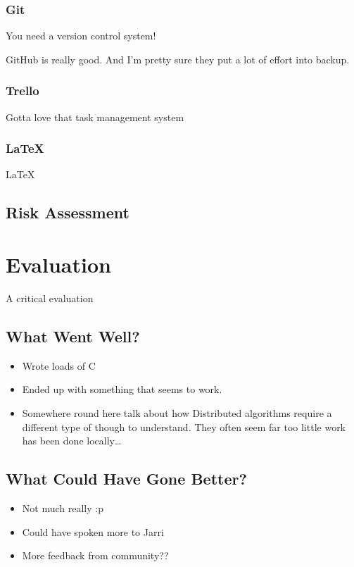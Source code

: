 \documentclass[12pt]{report}
\begin{document}
\subsection{Git}
You need a version control system!

GitHub is really good. And I'm pretty sure they put a lot of effort into backup.

\subsection{Trello}
Gotta love that task management system

\subsection{\LaTeX}
\LaTeX 

\section{Risk Assessment}


\chapter{Evaluation}
A critical evaluation

\section{What Went Well?}

\begin{itemize}
\item Wrote loads of C
\item Ended up with something that seems to work.
\item Somewhere round here talk about how Distributed algorithms require a
  different type of though to understand. They often seem far too little work
  has been done locally\ldots
\end{itemize}

\section{What Could Have Gone Better?}

\begin{itemize}
\item Not much really :p
\item Could have spoken more to Jarri
\item More feedback from community??
\end{itemize}
\end{document}
